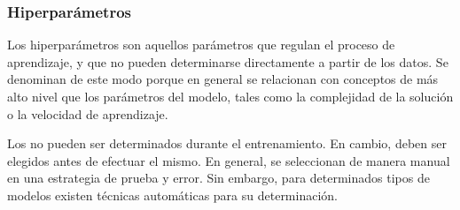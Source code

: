 %
\subsubsection{Hiperparámetros}
%
Los hiperparámetros son aquellos parámetros que regulan el proceso de
aprendizaje, y que no pueden determinarse directamente a partir de
los datos. Se denominan de este modo porque en general se relacionan
con conceptos de más alto nivel que los parámetros del modelo, tales
como la complejidad de la solución o la velocidad de aprendizaje.

Los \hparams{} no pueden ser determinados durante el entrenamiento.
En cambio, deben ser elegidos antes de efectuar el mismo.
En general, se seleccionan de manera manual en una estrategia de
prueba y error. Sin embargo, para determinados tipos de modelos
existen técnicas automáticas para su determinación.

